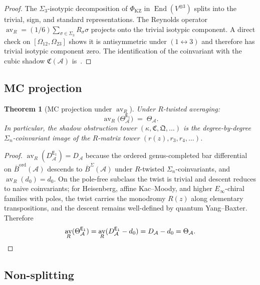 \documentclass[11pt,reqno]{amsart}
\newtheorem{theorem}{Theorem}[section]
\theoremstyle{definition}
\theoremstyle{remark}
\newcommand{\cA}{\mathcal{A}}
\newcommand{\Eone}{\mathsf{E}_{1}}
\DeclareMathOperator{\End}{End}
\DeclareMathOperator{\av}{av}
\newcommand{\Barord}{\overline{B}^{\mathrm{ord}}}
\newcommand{\BarSig}{\overline{B}^{\Sigma}}
\numberwithin{equation}{section}
\begin{document}
\begin{proof}
The $\Sigma_3$-isotypic decomposition of $\Phi_{\mathrm{KZ}}$ in
$\End(V^{\otimes 3})$ splits into the trivial, sign, and standard
representations. The Reynolds operator
$\av_R = (1/6)\sum_{\sigma \in \Sigma_3} R_\sigma\sigma$ projects onto the
trivial isotypic component. A direct check on
$[\Omega_{12}, \Omega_{23}]$ shows it is antisymmetric under
$(1 \leftrightarrow 3)$ and therefore has trivial isotypic component
zero. The identification of the coinvariant with the cubic shadow
$\mathfrak{C}(\cA)$ is~\cite[Theorem~D(iii)]{Lor26}.
\end{proof}

\subsection{MC projection}

\begin{theorem}[MC projection under $\av_R$]
\label{thm:av-mc-projection}
Under \(R\)-twisted averaging:
\begin{equation}\label{eq:av-mc}
  \av_R\bigl(\Theta^{\Eone}_\cA\bigr)
  \;=\; \Theta_\cA.
\end{equation}
In particular, the shadow obstruction tower
$(\kappa, \mathfrak{C}, \mathfrak{Q}, \ldots)$ is the
degree-by-degree $\Sigma_n$-coinvariant image of the $R$-matrix
tower $(r(z), r_3, r_4, \ldots)$.
\end{theorem}

\begin{proof}
$\av_R(D^{\Eone}_\cA) = D_\cA$ because the ordered genus-completed
bar differential on $\Barord(\cA)$ descends to $\BarSig(\cA)$
under $R$-twisted $\Sigma_n$-coinvariants, and
$\av_R(d_0) = d_0$. On the pole-free subclass the twist is trivial
and descent reduces to naive coinvariants; for Heisenberg, affine
Kac--Moody, and higher $E_\infty$-chiral families with poles, the
twist carries the monodromy $R(z)$ along elementary transpositions,
and the descent remains well-defined by quantum Yang--Baxter.
Therefore
\[
  \av_R(\Theta^{\Eone}_\cA)
  = \av_R(D^{\Eone}_\cA - d_0)
  = D_\cA - d_0
  = \Theta_\cA. \qedhere
\]
\end{proof}

\subsection{Non-splitting}
\end{document}
